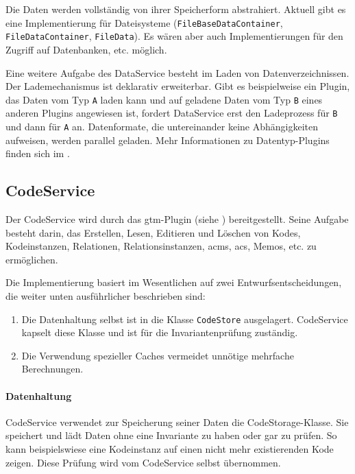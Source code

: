 Die Daten werden vollständig von ihrer Speicherform abstrahiert. Aktuell gibt es eine Implementierung für Dateisysteme (\texttt{FileBaseDataContainer}, \texttt{FileDataContainer}, \texttt{FileData}). Es wären aber auch Implementierungen für den Zugriff auf Datenbanken, etc. möglich.

Eine weitere Aufgabe des DataService besteht im Laden von Datenverzeichnissen. Der Lademechanismus ist deklarativ erweiterbar. Gibt es beispielweise ein Plugin, das Daten vom Typ \texttt{A} laden kann und auf geladene Daten vom Typ \texttt{B} eines anderen Plugins angewiesen ist, fordert DataService erst den Ladeprozess für \texttt{B} und dann für \texttt{A} an. Datenformate, die untereinander keine Abhängigkeiten aufweisen, werden parallel geladen. Mehr Informationen zu Datentyp-Plugins finden sich im .

\subsection*{CodeService}

Der CodeService wird durch das \acrshort{gtm}-Plugin (siehe ) bereitgestellt. Seine Aufgabe besteht darin, das Erstellen, Lesen, Editieren und Löschen von Kodes, Kodeinstanzen, Relationen, Relationsinstanzen, \glspl{acm}, \glspl{ac}, Memos, etc. zu ermöglichen.

Die Implementierung basiert im Wesentlichen auf zwei Entwurfsentscheidungen, die weiter unten ausführlicher beschrieben sind:
\begin{enumerate}
  \item Die Datenhaltung selbst ist in die Klasse \texttt{CodeStore} ausgelagert. CodeService kapselt diese Klasse und ist für die Invariantenprüfung zuständig.
  \item Die Verwendung spezieller Caches vermeidet unnötige mehrfache Berechnungen.
\end{enumerate}

\paragraph{Datenhaltung}

CodeService verwendet zur Speicherung seiner Daten die CodeStorage-Klasse. Sie speichert und lädt Daten ohne eine Invariante zu haben oder gar zu prüfen. So kann beispielswiese eine Kodeinstanz auf einen nicht mehr existierenden Kode zeigen. Diese Prüfung wird vom CodeService selbst übernommen.


